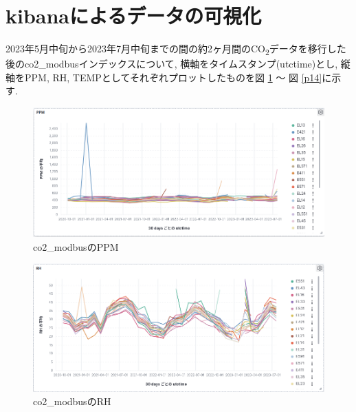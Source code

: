 \section{kibanaによるデータの可視化}

2023年5月中旬から2023年7月中旬までの間の約2ヶ月間のCO\textsubscript{2}データを移行した後のco2\_modbusインデックスについて, 横軸をタイムスタンプ(utctime)とし, 縦軸をPPM, RH, TEMPとしてそれぞれプロットしたものを図 \ref{p12} 〜 図 \ref{p14}に示す.

\begin{figure}[!ht]
    \begin{center}
        \includegraphics[width=160mm]{sotu/figure/ppm.png}
        \caption{co2\_modbusのPPM}
        \label{p12}
    \end{center}
\end{figure}

\begin{figure}[!ht]
    \begin{center}
        \includegraphics[width=160mm]{sotu/figure/rh.png}
        \caption{co2\_modbusのRH}
        \label{p13}
    \end{center}
\end{figure}

